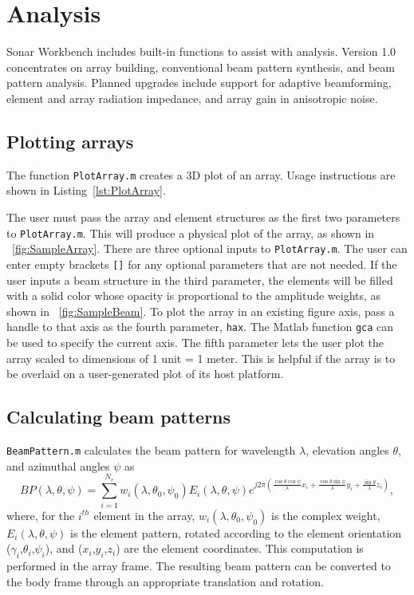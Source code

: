 \section{Analysis}\label{sec:analysis}

Sonar Workbench includes built-in functions to assist with analysis.  Version 1.0 concentrates on array building, conventional beam pattern synthesis, and beam pattern analysis. Planned upgrades include support for adaptive beamforming, element and array radiation impedance, and array gain in anisotropic noise.

\subsection{Plotting arrays}

The function \texttt{PlotArray.m} creates a 3D plot of an array. Usage instructions are shown in Listing~\ref{lst:PlotArray}.


 
The user must pass the array and element structures as the first two parameters to \texttt{PlotArray.m}. This will produce a physical plot of the array, as shown in \figname~\ref{fig:SampleArray}. There are three optional inputs to \texttt{PlotArray.m}. The user can enter empty brackets \texttt{[]} for any optional parameters that are not needed. If the user inputs a beam structure in the third parameter, the elements will be filled with a solid color whose opacity is proportional to the amplitude weights, as shown in \figname~\ref{fig:SampleBeam}. To plot the array in an existing figure axis, pass a handle to that axis as the fourth parameter, \texttt{hax}. The Matlab function \texttt{gca} can be used to specify the current axis. The fifth parameter lets the user plot the array scaled to dimensions of 1 unit = 1 meter. This is helpful if the array is to be overlaid on a user-generated plot of its host platform. 
 
\subsection{Calculating beam patterns}

\texttt{BeamPattern.m} calculates the beam pattern for wavelength $\lambda$, elevation angles $\theta$, and azimuthal angles $\psi$ as
\begin{equation}
BP(\lambda,\theta,\psi) = \sum_{i=1}^{N_e} w_i(\lambda,\theta_0,\psi_0)E_i(\lambda,\theta,\psi)e^{j2\pi\left(\frac{\cos\theta\cos\psi}{\lambda}x_i + \frac{\cos\theta\sin\psi}{\lambda}y_i + \frac{\sin\theta}{\lambda}z_i\right)},
\end{equation}
where, for the $i^{th}$ element in the array, $w_i(\lambda,\theta_0,\psi_0)$ is the complex weight, $E_i(\lambda,\theta,\psi)$ is the element pattern, rotated according to the element orientation ($\gamma_i$,$\theta_i$,$\psi_i$), and ($x_i$,$y_i$,$z_i$) are the element coordinates. This computation is performed in the array frame. The resulting beam pattern can be converted to the body frame through an appropriate translation and rotation.

